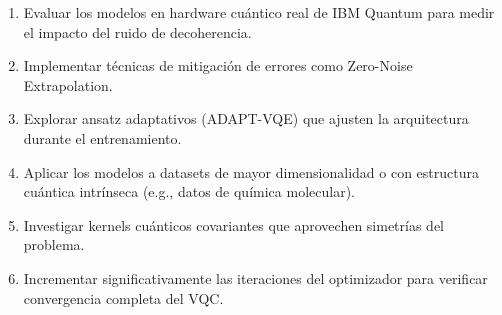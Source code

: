 \begin{enumerate}
    \item Evaluar los modelos en hardware cu\'antico real de IBM Quantum para medir el impacto del ruido de decoherencia.
    \item Implementar t\'ecnicas de mitigaci\'on de errores como Zero-Noise Extrapolation.
    \item Explorar ansatz adaptativos (ADAPT-VQE) que ajusten la arquitectura durante el entrenamiento.
    \item Aplicar los modelos a datasets de mayor dimensionalidad o con estructura cu\'antica intr\'inseca (e.g., datos de qu\'imica molecular).
    \item Investigar kernels cu\'anticos covariantes que aprovechen simetr\'ias del problema.
    \item Incrementar significativamente las iteraciones del optimizador para verificar convergencia completa del VQC.
\end{enumerate}
